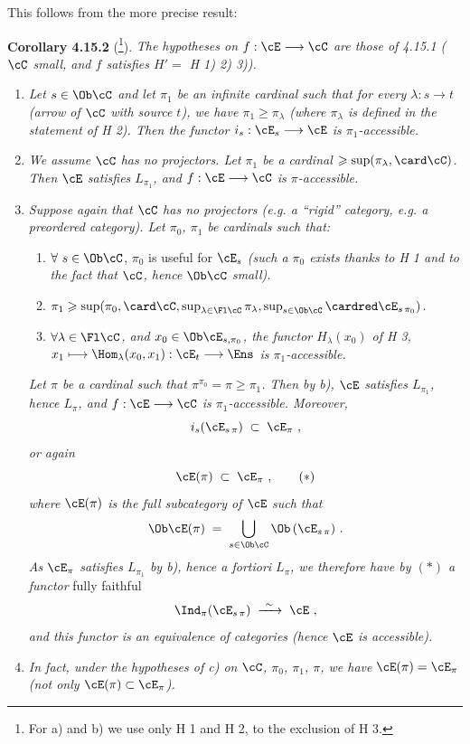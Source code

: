 This follows from the more precise result:


\textbf{Corollary 4.15.2} (\footnote{For a) and b) we use only H 1 and H 2, to the exclusion of H 3.}). \textit{The hypotheses on $f : \cE \longrightarrow \cC$ are those of 4.15.1 ($\cC$ small, and $f$ satisfies $H' =$ H 1) 2) 3)).}
\begin{enumerate}
\item[\textit{a)}] \textit{Let $s \in \Ob\cC$ and let $\pi_1$ be an infinite cardinal such that for every $\lambda : s \longrightarrow t$ (arrow of $\cC$ with source $t$), we have $\pi_1 \geqslant \pi_\lambda$ (where $\pi_\lambda$ is defined in the statement of H 2). Then the functor $i_s : \cE_s \longrightarrow \cE$ is $\pi_1$-accessible.} %
\item[\textit{b)}] \textit{We assume $\cC$ has no projectors. Let $\pi_1$ be a cardinal $\geqslant \sup(\pi_\lambda, \card\cC)$. Then $\cE$ satisfies $L_{\pi_1}$, and $f : \cE \longrightarrow \cC$ is $\pi$-accessible.}
\item[\textit{c)}] \textit{Suppose again that $\cC$ has no projectors (e.g. a ``rigid'' category, e.g. a preordered category). Let $\pi_0$, $\pi_1$ be cardinals such that:}
\begin{enumerate}
\item[\textcircled{\footnotesize $1^o$}] $\forall\ s \in \Ob\cC$, $\pi_0$ is useful for $\cE_s$ \textit{(such a $\pi_0$ exists thanks to H 1 and to the fact that $\cC$, hence $\Ob\cC$ small).}
\item[\textcircled{\footnotesize $2^o$}] $\pi_1 \geqslant \sup(\pi_0, \card\cC, \sup_{\lambda\in\Fl\cC}\pi_\lambda, \sup_{s\in\Ob\cC} \cardred \cE_{s\,\pi_0})$.
\item[\textcircled{\footnotesize $3^o$}] \textit{$\forall\lambda \in \Fl\cC$, and $x_0 \in \Ob\cE_{s,\pi_0}$, the functor $H_\lambda(x_0)$ of H 3, $x_1 \longmapsto \Hom_\lambda(x_0,x_1) : \cE_t \longrightarrow \Ens$ is $\pi_1$-accessible.}
\end{enumerate}
\textit{Let $\pi$ be a cardinal such that $\pi^{\pi_0} = \pi \geqslant \pi_1$. Then by b), $\cE$ satisfies $L_{\pi_1}$, hence $L_\pi$, and $f : \cE \longrightarrow \cC$ is $\pi_1$-accessible. Moreover,}
\[
i_s(\cE_{s\,\pi}) \;\subset\; \cE_\pi\ ,
\]
\textit{or again}
\[
\cE(\pi) \;\subset\; \cE_\pi\ , \tag*{$(*)$}
\]
\textit{where $\cE(\pi)$ is the full subcategory of $\cE$ such that}
\[
\Ob\cE(\pi) \;=\; \bigcup_{s\in\Ob\cC} \Ob\,(\cE_{s\,\pi})\ .
\]
\textit{As $\cE_\pi$ satisfies $L_{\pi_1}$ by b), hence a fortiori $L_\pi$, we therefore have by $(*)$ a functor} fully faithful
\[
\Ind_\pi(\cE_{s\,\pi}) \;\xrightarrow{\ \sim\ }\; \cE\ ,
\]
\textit{and this functor is an equivalence of categories (hence $\cE$ is accessible).}
\item[\textit{d)}] \textit{In fact, under the hypotheses of c) on $\cC$, $\pi_0$, $\pi_1$, $\pi$, we have $\cE(\pi) = \cE_\pi$ (not only $\cE(\pi) \subset \cE_\pi$).}
\end{enumerate}

